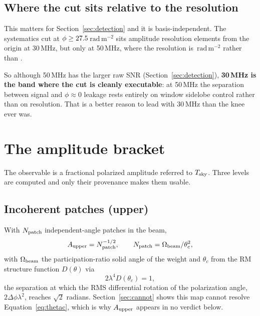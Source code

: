 \documentclass[11pt]{article}
\newcommand{\rmu}{\ensuremath{\mathrm{rad\,m^{-2}}}}
\newcommand{\lamsq}{\ensuremath{\lambda^{2}}}
\begin{document}
\subsection{Where the cut sits relative to the resolution}
\label{sec:cutresolution}

This matters for Section~\ref{sec:detection} and it is
basis-independent. The systematics cut at $\phi \ge 27.5$\,\rmu{}
sits \cutResThirty{} amplitude resolution elements from the origin at
30\,MHz, but only \cutResFifty{} at 50\,MHz, where the resolution is
\resAmpFifty\,\rmu{} rather than \resAmpThirty.

So although 50\,MHz has the larger raw SNR (Section~\ref{sec:detection}),
\textbf{30\,MHz is the band where the cut is cleanly executable}: at
50\,MHz the separation between signal and $\phi\approx0$ leakage rests
entirely on window sidelobe control rather than on resolution. That is
a better reason to lead with 30\,MHz than the knee ever was.

\section{The amplitude bracket}
\label{sec:bracket}

The observable is a fractional polarized amplitude referred to
$T_{\rm sky}$. Three levels are computed and only their provenance
makes them usable.

\subsection{Incoherent patches (upper)}

With $N_{\rm patch}$ independent-angle patches in the beam,
\begin{equation}
  A_{\rm upper} = N_{\rm patch}^{-1/2},
  \qquad N_{\rm patch} = \Omega_{\rm beam}/\theta_c^{2},
  \label{eq:upper}
\end{equation}
with $\Omega_{\rm beam}$ the participation-ratio solid angle of the
weight and $\theta_c$ from the RM structure function $D(\theta)$ via
\begin{equation}
  2\lambda^{4} D(\theta_c) = 1,
  \label{eq:thetac}
\end{equation}
the separation at which the RMS differential rotation of the
polarization angle, $2\Delta\phi\lamsq$, reaches $\sqrt2$ radians.
Section~\ref{sec:cannot} shows this map cannot resolve
Equation~\eqref{eq:thetac}, which is why $A_{\rm upper}$ appears in no
verdict below.
\end{document}
